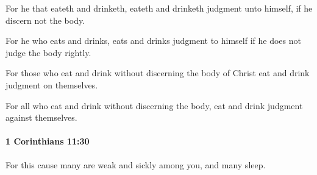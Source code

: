 			\begin{framed}
			\scriptsize
				\begin{compactdesc}
					\item[SBLG]  \hyperref[KRIMA]{} 
					\item[ASV] For he that eateth and drinketh, eateth and drinketh judgment unto himself, if he discern not the body.
					\item[NASB] For he who eats and drinks, eats and drinks judgment to himself if he does not judge the body rightly.
					\item[NIV] For those who eat and drink without discerning the body of Christ eat and drink judgment on themselves.
					\item[NRSV] For all who eat and drink without discerning the body, eat and drink judgment against themselves.
				\end{compactdesc}
			\end{framed}

		\paragraph{1 Corinthians 11:30} %
			\label{1CORINTHIANS-11-30}

			For this cause many are weak and sickly among you, and many sleep.

